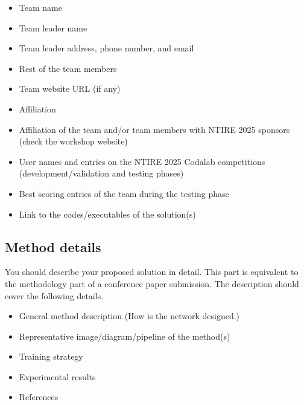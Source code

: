 \documentclass[10pt,twocolumn,letterpaper]{article}
\begin{document}
\begin{itemize}
\item Team name                                  
\item Team leader name                           
\item Team leader address, phone number, and email 
\item Rest of the team members        
\item Team website URL (if any)                   
\item Affiliation
\item Affiliation of the team and/or team members with NTIRE 2025 sponsors (check the workshop website)
\item User names and entries on the NTIRE 2025 Codalab competitions (development/validation and testing phases)
\item Best scoring entries of the team during the testing phase
\item Link to the codes/executables of the solution(s)
\end{itemize}

\subsection{Method details}

You should describe your proposed solution in detail. This part is equivalent to the methodology part of a conference paper submission. The description should cover the following details.

\begin{itemize}
\item General method description (How is the network designed.)                                
\item Representative image/diagram/pipeline of the method(s)  
\item Training strategy
\item Experimental results
\item References                                               
\end{itemize}
\end{document}

